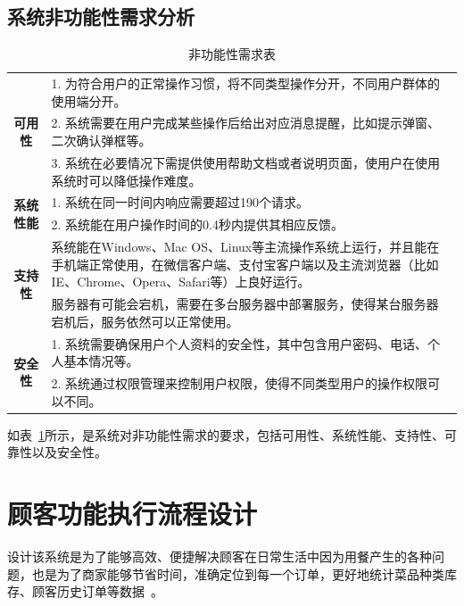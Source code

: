\subsection{系统非功能性需求分析}
\begin{table}[htbp!]
  \footnotesize
  \centering
  \caption{非功能性需求表}
  \vspace{2mm}
  \begin{tabular}{cp{9.5cm}}
  \hline
  \multirow{3}{3.5cm}{
    \textbf{可用性}
    }&1. 为符合用户的正常操作习惯，将不同类型操作分开，不同用户群体的使用端分开。\\
    &2. 系统需要在用户完成某些操作后给出对应消息提醒，比如提示弹窗、二次确认弹框等。\\
    &3. 系统在必要情况下需提供使用帮助文档或者说明页面，使用户在使用系统时可以降低操作难度。\\
  \hline
  \multirow{2}{3.5cm}{
    \textbf{系统性能}
    }&1. 系统在同一时间内响应需要超过190个请求。\\
    &2. 系统能在用户操作时间的0.4秒内提供其相应反馈。\\
  \hline
  \multirow{2}{3.5cm}{
    \textbf{支持性}
    }&系统能在Windows、Mac OS、Linux等主流操作系统上运行，并且能在手机端正常使用，在微信客户端、支付宝客户端以及主流浏览器（比如IE、Chrome、Opera、Safari等）上良好运行。\\
  \hline
  \multirow{2}{3.5cm}{
    \textbf{可靠性}
    }&服务器有可能会宕机，需要在多台服务器中部署服务，使得某台服务器宕机后，服务依然可以正常使用。\\
  \hline
  \multirow{2}{3.5cm}{
    \textbf{安全性}
    }&1. 系统需要确保用户个人资料的安全性，其中包含用户密码、电话、个人基本情况等。\\
    &2. 系统通过权限管理来控制用户权限，使得不同类型用户的操作权限可以不同。\\
  \hline
  \end{tabular}
  \label{table:systemsRequirement}
\end{table}
如表~\ref{table:systemsRequirement}所示，是系统对非功能性需求的要求，包括可用性、系统性能、支持性、可靠性以及安全性。

\section{顾客功能执行流程设计}
设计该系统是为了能够高效、便捷解决顾客在日常生活中因为用餐产生的各种问题，也是为了商家能够节省时间，准确定位到每一个订单，更好地统计菜品种类库存、顾客历史订单等数据~\cite{battistini1999order}。

